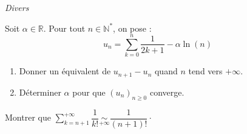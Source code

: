 \documentclass[a4paper,twoside,french,11pt]{VcCours}
\newcommand{\Sum}[2]{\ensuremath{\textstyle{\sum\limits_{#1}^{#2}}}}
\begin{document}
\medskip

\begin{center}
\textit{{ {\large Divers}}}
\end{center}

\medskip

\begin{Exercice}[$\bigstar$] Soit $\alpha \in \mathbb{R}$. Pour tout $n \in \mathbb{N}^*$, on pose :
$$ u_n = \sum_{k=0}^n \frac{1}{2k+1} -  \alpha \ln(n)$$

\begin{enumerate}
\item Donner un équivalent de $u_{n+1}-u_n$ quand $n$ tend vers $+ \infty$.
\item Déterminer $\alpha$ pour que $(u_n)_{n \geq 0}$ converge.
\end{enumerate}
\end{Exercice} 


\begin{Exercice}[$\bigstar$] Montrer que $\Sum{k=n+1}{+ \infty} \dfrac{1}{k!} \underset{ + \infty}{\sim} \dfrac{1}{(n+1)!} \cdot$ \end{Exercice}
\end{document}
